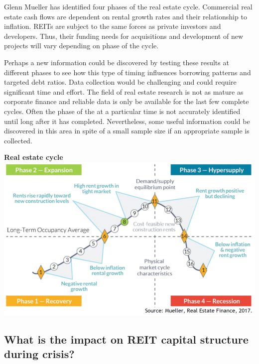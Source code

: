 \documentclass[a4paper, 12pt]{article} %
\begin{document}
Glenn Mueller has identified four phases of the real estate cycle. Commercial real estate cash flows are dependent on rental growth rates and their relationship to inflation. REITs are subject to the same forces as private investors and developers. Thus, their funding needs for acquisitions and development of new projects will vary depending on phase of the cycle. 

Perhaps a new information could be discovered by testing these results at different phases to see how this type of timing influences borrowing patterns and targeted debt ratios. Data collection would be challenging and could require significant time and effort. The field of real estate research is not as mature as corporate finance and reliable data is only be available for the last few complete cycles. Often the phase of the at a particular time is not accurately identified until long after it has completed. Nevertheless, some useful information could be discovered in this area in spite of a small sample size if an appropriate sample is collected.

\begin{center}
\textbf{Real estate cycle}
\includegraphics[width=1\textwidth]{recycle.png}

\end{center}
\subsection*{What is the impact on REIT capital structure during crisis?}
\end{document}
